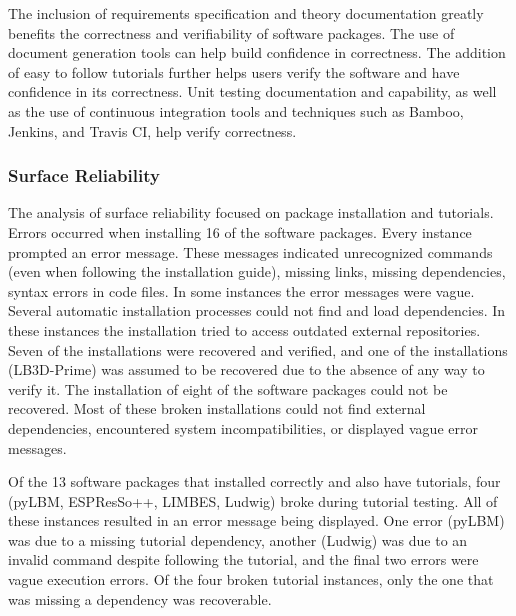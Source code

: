 \documentclass[12pt, notitlepage]{article}
\begin{document}
The inclusion of requirements specification and theory documentation greatly benefits the correctness and verifiability of software packages. The use of document generation tools can help build confidence in correctness. The addition of easy to follow tutorials further helps users verify the software and have confidence in its correctness. Unit testing documentation and capability, as well as the use of continuous integration tools and techniques such as Bamboo, Jenkins, and Travis CI, help verify correctness.

\subsubsection{Surface Reliability}

The analysis of surface reliability focused on package installation and tutorials. Errors occurred when installing 16 of the software packages. Every instance prompted an error message. These messages indicated unrecognized commands (even when following the installation guide), missing links, missing dependencies, syntax errors in code files. In some instances the error messages were vague. Several automatic installation processes could not find and load dependencies. In these instances the installation tried to access outdated external repositories. Seven of the installations were recovered and verified, and one of the installations (LB3D-Prime) was assumed to be recovered due to the absence of any way to verify it. The installation of eight of the software packages could not be recovered. Most of these broken installations could not find external dependencies, encountered system incompatibilities, or displayed vague error messages. 

Of the 13 software packages that installed correctly and also have tutorials, four (pyLBM, ESPResSo++, LIMBES, Ludwig) broke during tutorial testing. All of these instances resulted in an error message being displayed. One error (pyLBM) was due to a missing tutorial dependency, another (Ludwig) was due to an invalid command despite following the tutorial, and the final two errors were vague execution errors. Of the four broken tutorial instances, only the one that was missing a dependency was recoverable. 
\end{document}

